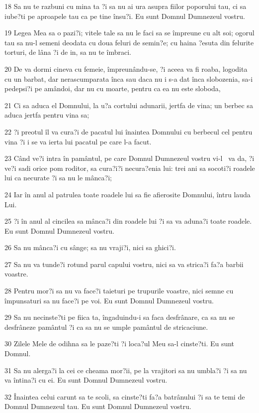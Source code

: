 \par 18 Sa nu te razbuni cu mina ta ?i sa nu ai ura asupra fiilor poporului tau, ci sa iube?ti pe aproapele tau ca pe tine însu?i. Eu sunt Domnul Dumnezeul vostru.
\par 19 Legea Mea sa o pazi?i; vitele tale sa nu le faci sa se împreune cu alt soi; ogorul tau sa nu-l semeni deodata cu doua feluri de semin?e; cu haina ?esuta din felurite torturi, de lâna ?i de in, sa nu te îmbraci.
\par 20 De va dormi cineva cu femeie, împreunându-se, ?i aceea va fi roaba, logodita cu un barbat, dar nerascumparata înca sau daca nu i s-a dat înca slobozenia, sa-i pedepsi?i pe amândoi, dar nu cu moarte, pentru ca ea nu este sloboda,
\par 21 Ci sa aduca el Domnului, la u?a cortului adunarii, jertfa de vina; un berbec sa aduca jertfa pentru vina sa;
\par 22 ?i preotul îl va cura?i de pacatul lui înaintea Domnului cu berbecul cel pentru vina ?i i se va ierta lui pacatul pe care l-a facut.
\par 23 Când ve?i intra în pamântul, pe care Domnul Dumnezeul vostru vi-l  va da, ?i ve?i sadi orice pom roditor, sa cura?i?i necura?enia lui: trei ani sa socoti?i roadele lui ca necurate ?i sa nu le mânca?i;
\par 24 Iar în anul al patrulea toate roadele lui sa fie afierosite Domnului, întru lauda Lui.
\par 25 ?i în anul al cincilea sa mânca?i din roadele lui ?i sa va aduna?i toate roadele. Eu sunt Domnul Dumnezeul vostru.
\par 26 Sa nu mânca?i cu sânge; sa nu vraji?i, nici sa ghici?i.
\par 27 Sa nu va tunde?i rotund parul capului vostru, nici sa va strica?i fa?a barbii voastre.
\par 28 Pentru mor?i sa nu va face?i taieturi pe trupurile voastre, nici semne cu împunsaturi sa nu face?i pe voi. Eu sunt Domnul Dumnezeul vostru.
\par 29 Sa nu necinste?ti pe fiica ta, îngaduindu-i sa faca desfrânare, ca sa nu se desfrâneze pamântul ?i ca sa nu se umple pamântul de stricaciune.
\par 30 Zilele Mele de odihna sa le paze?ti ?i loca?ul Meu sa-l cinste?ti. Eu sunt Domnul.
\par 31 Sa nu alerga?i la cei ce cheama mor?ii, pe la vrajitori sa nu umbla?i ?i sa nu va întina?i cu ei. Eu sunt Domnul Dumnezeul vostru.
\par 32 Înaintea celui carunt sa te scoli, sa cinste?ti fa?a batrânului ?i sa te temi de Domnul Dumnezeul tau. Eu sunt Domnul Dumnezeul vostru.

